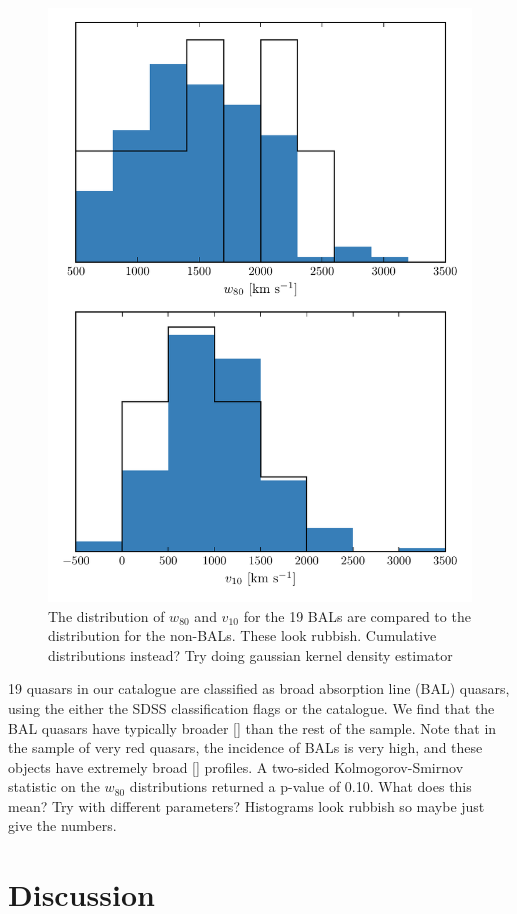 \begin{figure}
    \centering
    \includegraphics[width=0.8\linewidth]{figures/chapter04/bal_hists.pdf} 
    \caption{The distribution of $w_{80}$ and $v_{10}$ for the 19 BALs are compared to the distribution for the non-BALs. These look rubbish. Cumulative distributions instead? Try doing gaussian kernel density estimator}     
    \label{fig:bal_hists}
\end{figure}

19 quasars in our catalogue are classified as broad absorption line (BAL) quasars, using the either the SDSS classification flags or the \citet{allen11} catalogue. 
We find that the BAL quasars have typically broader [] than the rest of the sample. 
Note that in the \citet{zakamska16} sample of very red quasars, the incidence of BALs is very high, and these objects have extremely broad [] profiles. 
A two-sided Kolmogorov-Smirnov statistic on the $w_{80}$ distributions returned a p-value of 0.10. 
What does this mean?
Try with different parameters?
Histograms look rubbish so maybe just give the numbers. 

\section{Discussion}

